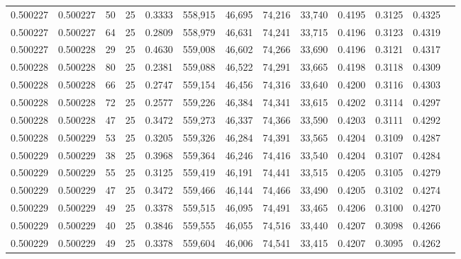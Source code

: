 \begin{tabular}{rrrrrrrrrrrrr}
0.500227 & 0.500227 &    50 &  25 &                                     0.3333 & 558,915 &  46,695 &  74,216 &  33,740 & 0.4195 & 0.3125 & 0.4325 \\
0.500227 & 0.500227 &    64 &  25 &                                     0.2809 & 558,979 &  46,631 &  74,241 &  33,715 & 0.4196 & 0.3123 & 0.4319 \\
0.500227 & 0.500228 &    29 &  25 &                                     0.4630 & 559,008 &  46,602 &  74,266 &  33,690 & 0.4196 & 0.3121 & 0.4317 \\
0.500228 & 0.500228 &    80 &  25 &                                     0.2381 & 559,088 &  46,522 &  74,291 &  33,665 & 0.4198 & 0.3118 & 0.4309 \\
0.500228 & 0.500228 &    66 &  25 &                                     0.2747 & 559,154 &  46,456 &  74,316 &  33,640 & 0.4200 & 0.3116 & 0.4303 \\
0.500228 & 0.500228 &    72 &  25 &                                     0.2577 & 559,226 &  46,384 &  74,341 &  33,615 & 0.4202 & 0.3114 & 0.4297 \\
0.500228 & 0.500228 &    47 &  25 &                                     0.3472 & 559,273 &  46,337 &  74,366 &  33,590 & 0.4203 & 0.3111 & 0.4292 \\
0.500228 & 0.500229 &    53 &  25 &                                     0.3205 & 559,326 &  46,284 &  74,391 &  33,565 & 0.4204 & 0.3109 & 0.4287 \\
0.500229 & 0.500229 &    38 &  25 &                                     0.3968 & 559,364 &  46,246 &  74,416 &  33,540 & 0.4204 & 0.3107 & 0.4284 \\
0.500229 & 0.500229 &    55 &  25 &                                     0.3125 & 559,419 &  46,191 &  74,441 &  33,515 & 0.4205 & 0.3105 & 0.4279 \\
0.500229 & 0.500229 &    47 &  25 &                                     0.3472 & 559,466 &  46,144 &  74,466 &  33,490 & 0.4205 & 0.3102 & 0.4274 \\
0.500229 & 0.500229 &    49 &  25 &                                     0.3378 & 559,515 &  46,095 &  74,491 &  33,465 & 0.4206 & 0.3100 & 0.4270 \\
0.500229 & 0.500229 &    40 &  25 &                                     0.3846 & 559,555 &  46,055 &  74,516 &  33,440 & 0.4207 & 0.3098 & 0.4266 \\
0.500229 & 0.500229 &    49 &  25 &                                     0.3378 & 559,604 &  46,006 &  74,541 &  33,415 & 0.4207 & 0.3095 & 0.4262 \\

\end{tabular}
